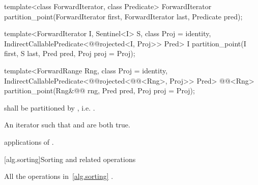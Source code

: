 %
\begin{removedblock}
\begin{itemdecl}
template<class ForwardIterator, class Predicate>
  ForwardIterator partition_point(ForwardIterator first,
                                  ForwardIterator last,
                                  Predicate pred);
\end{itemdecl}
\end{removedblock}
\begin{addedblock}
\begin{itemdecl}
template<ForwardIterator I, Sentinel<I> S, class Proj = identity,
    IndirectCallablePredicate<@@rojected<I, Proj>> Pred>
  I partition_point(I first, S last, Pred pred, Proj proj = Proj{});

template<ForwardRange Rng, class Proj = identity,
    IndirectCallablePredicate<@@rojected<@@<Rng>, Proj>> Pred>
  @@<Rng>
    partition_point(Rng&@\newtxt{\&}@ rng, Pred pred, Proj proj = Proj{});
\end{itemdecl}
\end{addedblock}

\begin{itemdescr}
\pnum
\requires {} shall be partitioned by , i.e.
.

\pnum
\returns An iterator  such that  and
 are both true.

\pnum
\complexity {} applications of .
\end{itemdescr}


[alg.sorting]{Sorting and related operations}

\pnum
All the operations in~\ref{alg.sorting} .

